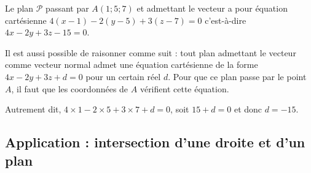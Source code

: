 \documentclass[11pt,fleqn, openany]{book} %
\begin{document}
\begin{example} Le plan $\mathcal{P}$ passant par $A(1;5;7)$ et admettant le vecteur \renewcommand{\arraystretch}{1} a pour équation cartésienne $4(x-1)-2(y-5)+3(z-7)=0$ c'est-à-dire $4x-2y+3z-15=0$.\end{example}
Il est aussi possible de raisonner comme suit : tout plan admettant le vecteur \renewcommand{\arraystretch}{1} comme vecteur normal admet une équation cartésienne de la forme $4x-2y+3z+d=0$ pour un certain réel $d$. Pour que ce plan passe par le point $A$, il faut que les coordonnées de $A$ vérifient cette équation.

Autrement dit, $4 \times 1 -2 \times 5 + 3 \times 7 + d =0$, soit $15+d=0$ et donc $d=-15$.





\subsection{Application : intersection d'une droite et d'un plan}
\end{document}
